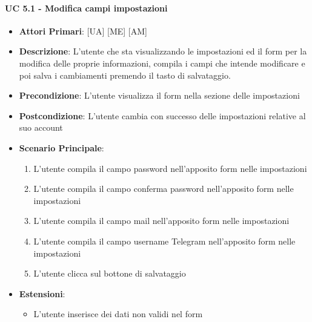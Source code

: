 		\paragraph{UC 5.1 - Modifica campi impostazioni}
			\begin{itemize}
				\item \textbf{Attori Primari}: [UA] [ME] [AM]
				\item \textbf{Descrizione}: L'utente che sta visualizzando le impostazioni ed il form per la modifica delle proprie informazioni, compila i campi che intende modificare e poi salva i cambiamenti premendo il tasto di salvataggio.
				\item \textbf{Precondizione}: L'utente visualizza il form nella sezione delle impostazioni
				\item \textbf{Postcondizione}: L'utente cambia con successo delle impostazioni relative al suo account
				\item \textbf{Scenario Principale}:
				\begin{enumerate}
					\item{L'utente compila il campo password nell'apposito form nelle impostazioni}
					\item{L'utente compila il campo conferma password nell'apposito form nelle impostazioni}
					\item{L'utente compila il campo mail nell'apposito form nelle impostazioni}
					\item{L'utente compila il campo username Telegram nell'apposito form nelle impostazioni}
					\item{L'utente clicca sul bottone di salvataggio}
				\end{enumerate}	
				\item \textbf{Estensioni}:
					\begin{itemize}
						\item L'utente inserisce dei dati non validi nel form
					\end{itemize}
			\end{itemize}

